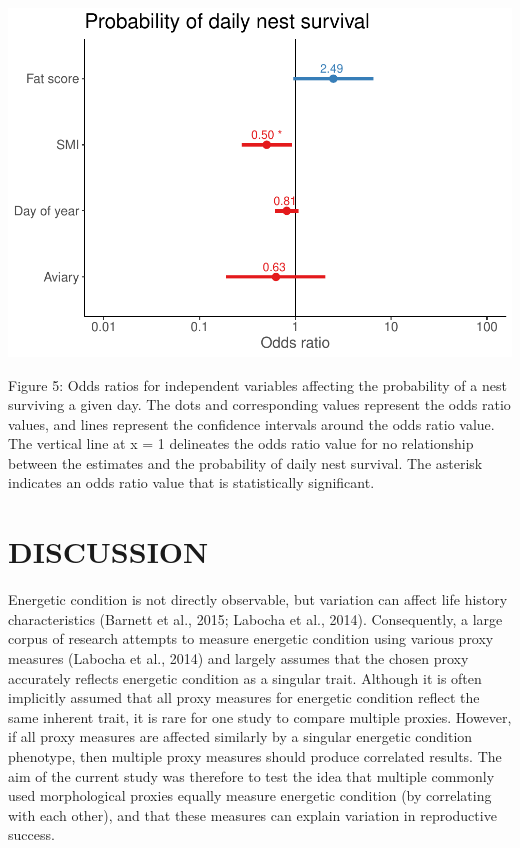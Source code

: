 \documentclass[
]{article}
\begin{document}
\includegraphics{gcondition_files/figure-latex/logoddfig-1.pdf}

Figure 5: Odds ratios for independent variables affecting the
probability of a nest surviving a given day. The dots and corresponding
values represent the odds ratio values, and lines represent the
confidence intervals around the odds ratio value. The vertical line at x
= 1 delineates the odds ratio value for no relationship between the
estimates and the probability of daily nest survival. The asterisk
indicates an odds ratio value that is statistically significant.

\hypertarget{discussion}{%
\section{DISCUSSION}\label{discussion}}

Energetic condition is not directly observable, but variation can affect
life history characteristics (Barnett et al., 2015; Labocha et al.,
2014). Consequently, a large corpus of research attempts to measure
energetic condition using various proxy measures (Labocha et al., 2014)
and largely assumes that the chosen proxy accurately reflects energetic
condition as a singular trait. Although it is often implicitly assumed
that all proxy measures for energetic condition reflect the same
inherent trait, it is rare for one study to compare multiple proxies.
However, if all proxy measures are affected similarly by a singular
energetic condition phenotype, then multiple proxy measures should
produce correlated results. The aim of the current study was therefore
to test the idea that multiple commonly used morphological proxies
equally measure energetic condition (by correlating with each other),
and that these measures can explain variation in reproductive success.
\end{document}
